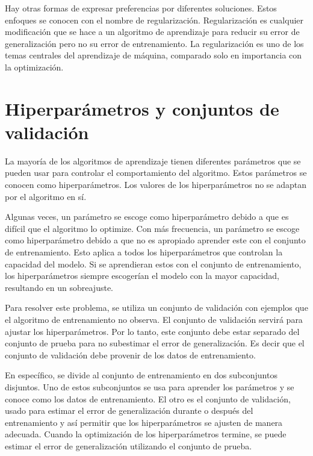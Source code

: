 \vspace{1em}

Hay otras formas de expresar preferencias por diferentes soluciones. Estos enfoques se conocen con el nombre de regularización. Regularización es cualquier modificación que se hace a un algoritmo de aprendizaje para reducir su error de generalización pero no su error de entrenamiento. La regularización es uno de los temas centrales del aprendizaje de máquina, comparado solo en importancia con la optimización. 
\cite{goodfellow-et-al-2016}

\section{Hiperparámetros y conjuntos de validación}
La mayoría de los algoritmos de aprendizaje tienen diferentes parámetros que se pueden usar para controlar el comportamiento del algoritmo. Estos parámetros se conocen como hiperparámetros. Los valores de los hiperparámetros no se adaptan por el algoritmo en sí. 

\vspace{1em}

Algunas veces, un parámetro se escoge como hiperparámetro debido a que es difícil que el algoritmo lo optimize. Con más frecuencia, un parámetro se escoge como hiperparámetro debido a que no es apropiado aprender este con el conjunto de entrenamiento. Esto aplica a todos los hiperparámetros que controlan la capacidad del modelo. Si se aprendieran estos con el conjunto de entrenamiento, los hiperparámetros siempre escogerían el modelo con la mayor capacidad, resultando en un sobreajuste.
\cite{goodfellow-et-al-2016}

\vspace{1em}

Para resolver este problema, se utiliza un conjunto de validación con ejemplos que el algoritmo de entrenamiento no observa. El conjunto de validación servirá para ajustar los hiperparámetros. Por lo tanto, este conjunto debe estar separado del conjunto de prueba para no subestimar el error de generalización. Es decir que el conjunto de validación debe provenir de los datos de entrenamiento.

\vspace{1em}

En específico, se divide al conjunto de entrenamiento en dos subconjuntos disjuntos. Uno de estos subconjuntos se usa para aprender los parámetros y se conoce como los datos de entrenamiento. El otro es el conjunto de validación, usado para estimar el error de generalización durante o después del entrenamiento y así permitir que los hiperparámetros se ajusten de manera adecuada. Cuando la optimización de los hiperparámetros termine, se puede estimar el error de generalización utilizando el conjunto de prueba.
\cite{goodfellow-et-al-2016}
\cite{hastie01statisticallearning}

